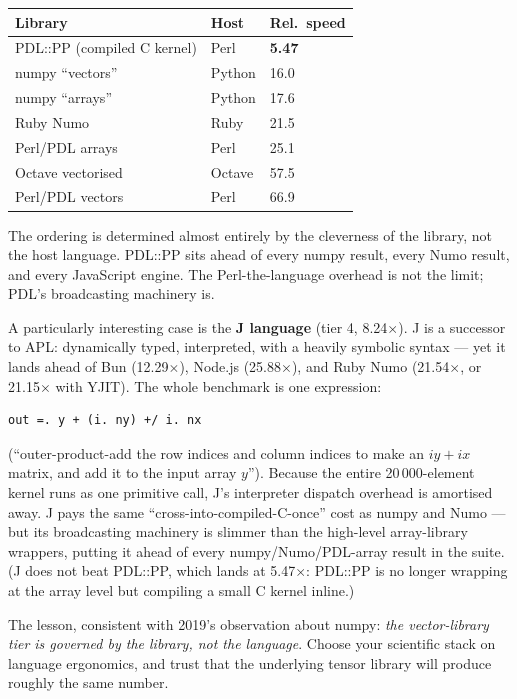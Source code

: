 \documentclass[11pt,a4paper]{article}
\begin{document}
\begin{center}\small
\begin{tabular}{lll}
\toprule
\textbf{Library} & \textbf{Host} & \textbf{Rel.~speed} \\
\midrule
PDL::PP (compiled C kernel) & Perl & \textbf{5.47} \\
numpy ``vectors''            & Python & 16.0 \\
numpy ``arrays''             & Python & 17.6 \\
Ruby Numo                    & Ruby & 21.5 \\
Perl/PDL arrays              & Perl & 25.1 \\
Octave vectorised            & Octave & 57.5 \\
Perl/PDL vectors             & Perl & 66.9 \\
\bottomrule
\end{tabular}
\end{center}

\noindent
The ordering is determined almost entirely by the cleverness of the
library, not the host language. PDL::PP sits ahead of every numpy
result, every Numo result, and every JavaScript engine. The
Perl-the-language overhead is not the limit; PDL's broadcasting
machinery is.

A particularly interesting case is the \textbf{J language} (tier 4,
8.24$\times$). J is a successor to APL: dynamically typed,
interpreted, with a heavily symbolic syntax --- yet it lands ahead of
Bun (12.29$\times$), Node.js (25.88$\times$), and Ruby Numo
(21.54$\times$, or 21.15$\times$ with YJIT). The whole benchmark is one expression:

\begin{lstlisting}
out =. y + (i. ny) +/ i. nx
\end{lstlisting}

\noindent
(``outer-product-add the row indices and column indices to make an
$iy+ix$ matrix, and add it to the input array $y$''). Because the
entire 20\,000-element kernel runs as one primitive call, J's
interpreter dispatch overhead is amortised away. J pays the same
``cross-into-compiled-C-once'' cost as numpy and Numo --- but its
broadcasting machinery is slimmer than the high-level array-library
wrappers, putting it ahead of every numpy/Numo/PDL-array result in
the suite. (J does not beat PDL::PP, which lands at 5.47$\times$:
PDL::PP is no longer wrapping at the array level but compiling a
small C kernel inline.)

The lesson, consistent with 2019's observation about numpy:
\emph{the vector-library tier is governed by the library, not the
language}. Choose your scientific stack on language ergonomics, and
trust that the underlying tensor library will produce roughly the
same number.
\end{document}
